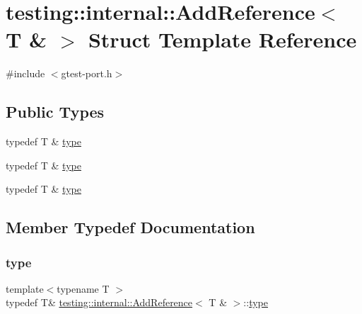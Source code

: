 \hypertarget{structtesting_1_1internal_1_1_add_reference_3_01_t_01_6_01_4}{}\section{testing\+::internal\+::Add\+Reference$<$ T \& $>$ Struct Template Reference}
\label{structtesting_1_1internal_1_1_add_reference_3_01_t_01_6_01_4}


{\ttfamily \#include $<$gtest-\/port.\+h$>$}

\subsection*{Public Types}
\begin{DoxyCompactItemize}
\item 
typedef T \& \mbox{\hyperlink{structtesting_1_1internal_1_1_add_reference_3_01_t_01_6_01_4_a93c064cdcdaced0abd167258425e57af}{type}}
\item 
typedef T \& \mbox{\hyperlink{structtesting_1_1internal_1_1_add_reference_3_01_t_01_6_01_4_a93c064cdcdaced0abd167258425e57af}{type}}
\item 
typedef T \& \mbox{\hyperlink{structtesting_1_1internal_1_1_add_reference_3_01_t_01_6_01_4_a93c064cdcdaced0abd167258425e57af}{type}}
\end{DoxyCompactItemize}


\subsection{Member Typedef Documentation}
\mbox{\label{structtesting_1_1internal_1_1_add_reference_3_01_t_01_6_01_4_a93c064cdcdaced0abd167258425e57af}} 
\subsubsection{\texorpdfstring{type}{type}\hspace{0.1cm}{\footnotesize\ttfamily [1/3]}}
{\footnotesize\ttfamily template$<$typename T $>$ \\
typedef T\& \mbox{\hyperlink{structtesting_1_1internal_1_1_add_reference}{testing\+::internal\+::\+Add\+Reference}}$<$ T \& $>$\+::\mbox{\hyperlink{structtesting_1_1internal_1_1_add_reference_3_01_t_01_6_01_4_a93c064cdcdaced0abd167258425e57af}{type}}}


